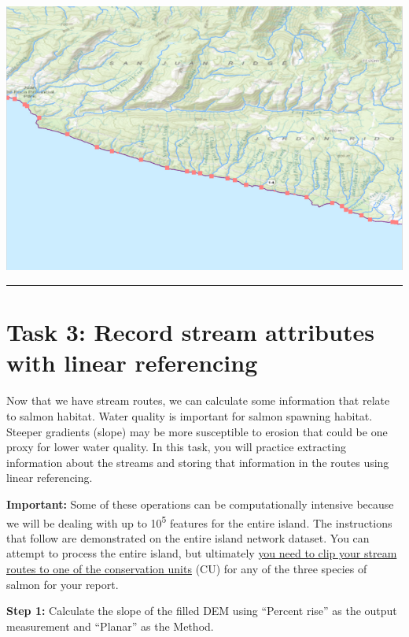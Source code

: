 \documentclass[
]{book}
\begin{document}
\includegraphics[width=1\linewidth]{images/02-ocean-stream-junctions}

\begin{center}\rule{0.5\linewidth}{0.5pt}\end{center}

\hypertarget{task-3-record-stream-attributes-with-linear-referencing}{%
\section*{Task 3: Record stream attributes with linear referencing}\label{task-3-record-stream-attributes-with-linear-referencing}}

Now that we have stream routes, we can calculate some information that relate to salmon habitat. Water quality is important for salmon spawning habitat. Steeper gradients (slope) may be more susceptible to erosion that could be one proxy for lower water quality. In this task, you will practice extracting information about the streams and storing that information in the routes using linear referencing.

\textbf{Important:} Some of these operations can be computationally intensive because we will be dealing with up to 10\textsuperscript{5} features for the entire island. The instructions that follow are demonstrated on the entire island network dataset. You can attempt to process the entire island, but ultimately \ul{you need to clip your stream routes to one of the conservation units} (CU) for any of the three species of salmon for your report.

\textbf{Step 1:} Calculate the slope of the filled DEM using ``Percent rise'' as the output measurement and ``Planar'' as the Method.
\end{document}
